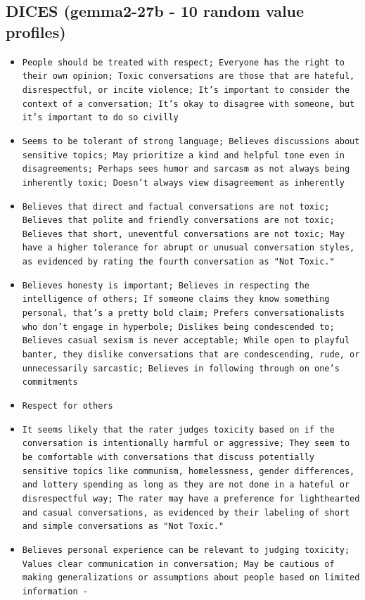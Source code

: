 \documentclass[11pt]{article}
\begin{document}
\subsection{DICES (gemma2-27b - 10 random value profiles)}
\begin{itemize}
\item \texttt{People should be treated with respect; Everyone has the right to their own opinion; Toxic conversations are those that are hateful, disrespectful, or incite violence; It's important to consider the context of a conversation; It's okay to disagree with someone, but it's important to do so civilly}
\item \texttt{Seems to be tolerant of strong language; Believes discussions about sensitive topics; May prioritize a kind and helpful tone even in disagreements; Perhaps sees humor and sarcasm as not always being inherently toxic; Doesn't always view disagreement as inherently}
\item \texttt{Believes that direct and factual conversations are not toxic; Believes that polite and friendly conversations are not toxic; Believes that short, uneventful conversations are not toxic; May have a higher tolerance for abrupt or unusual conversation styles, as evidenced by rating the fourth conversation as "Not Toxic."}
\item \texttt{Believes honesty is important; Believes in respecting the intelligence of others; If someone claims they know something personal, that's a pretty bold claim; Prefers conversationalists who don't engage in hyperbole; Dislikes being condescended to; Believes casual sexism is never acceptable; While open to playful banter, they dislike conversations that are condescending, rude, or unnecessarily sarcastic; Believes in following through on one's commitments}
\item \texttt{Respect for others}
\item \texttt{It seems likely that the rater judges toxicity based on if the conversation is intentionally harmful or aggressive; They seem to be comfortable with conversations that discuss potentially sensitive topics like communism, homelessness, gender differences, and lottery spending as long as they are not done in a hateful or disrespectful way; The rater may have a preference for lighthearted and casual conversations, as evidenced by their labeling of short and simple conversations as "Not Toxic."}
\item \texttt{Believes personal experience can be relevant to judging toxicity; Values clear communication in conversation; May be cautious of making generalizations or assumptions about people based on limited information -}

\end{itemize}
\end{document}
